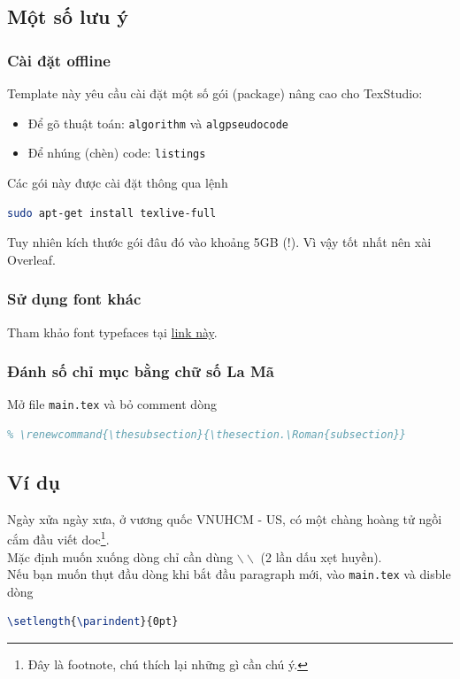 \subsection{Một số lưu ý}

\subsubsection{Cài đặt offline}
Template này yêu cầu cài đặt một số gói (package) nâng cao cho TexStudio:
\begin{itemize}
\item Để gõ thuật toán: \texttt{algorithm} và \texttt{algpseudocode}
\item Để nhúng (chèn) code: \texttt{listings}
\end{itemize}
Các gói này được cài đặt thông qua lệnh
\begin{lstlisting}[language=sh]
sudo apt-get install texlive-full
\end{lstlisting}
Tuy nhiên kích thước gói đâu đó vào khoảng 5GB (!). Vì vậy tốt nhất nên xài Overleaf.

\subsubsection{Sử dụng font khác}
Tham khảo font typefaces tại \href{https://www.overleaf.com/learn/latex/Font_typefaces}{link này}.

\subsubsection{Đánh số chỉ mục bằng chữ số La Mã}
Mở file \texttt{main.tex} và bỏ comment dòng 
\begin{lstlisting}[language=tex]
% \renewcommand{\thesection}{\Roman{section}}
% \renewcommand{\thesubsection}{\thesection.\Roman{subsection}}  
\end{lstlisting}

\subsection{Ví dụ}
Ngày xửa ngày xưa, ở vương quốc VNUHCM - US, có một chàng hoàng tử ngồi cắm đầu viết doc\footnote{Đây là footnote, chú thích lại những gì cần chú ý.}.\\
Mặc định muốn xuống dòng chỉ cần dùng $\backslash\backslash$  (2 lần dấu xẹt huyền).\\
Nếu bạn muốn thụt đầu dòng khi bắt đầu paragraph mới, vào \texttt{main.tex} và disble dòng
\begin{lstlisting}[language=tex]
\setlength{\parindent}{0pt}
\end{lstlisting}

